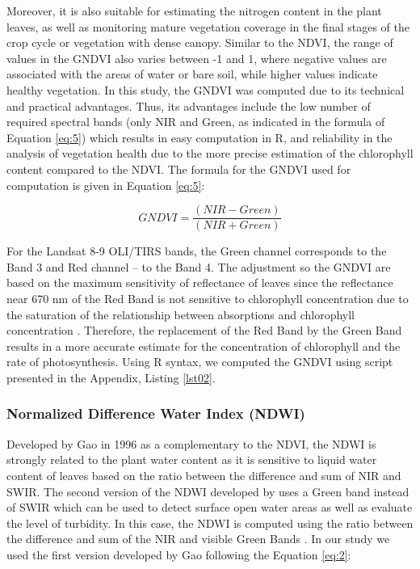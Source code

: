 \documentclass[jimaging,article,submit,pdftex,moreauthors]{Definitions/mdpi}
\begin{document}
Moreover, it is also suitable for estimating the nitrogen content in the plant leaves, as well as monitoring mature vegetation coverage in the final stages of the crop cycle or vegetation with dense canopy. Similar to the NDVI, the range of values in the GNDVI also varies between -1 and 1, where negative values are associated with the areas of water or bare soil, while higher values indicate healthy vegetation. In this study, the GNDVI was computed due to its technical and practical advantages. Thus, its advantages include the low number of required spectral bands (only NIR and Green, as indicated in the formula of Equation \ref{eq:5}) which results in easy computation in R, and reliability in the analysis of vegetation health due to the more precise estimation of the chlorophyll content compared to the NDVI. The formula for the GNDVI used for computation is given in Equation \ref{eq:5}:

\begin{equation}\label{eq:5}
	GNDVI=\dfrac{(NIR-Green)}{(NIR+Green)}
\end{equation}

For the Landsat 8-9 OLI/TIRS bands, the Green channel corresponds to the Band 3 and Red channel -- to the Band 4. The adjustment so the GNDVI are based on the maximum sensitivity of reflectance of leaves since the reflectance near 670 nm of the Red Band is not sensitive to chlorophyll concentration due to the saturation of the relationship between absorptions and chlorophyll concentration \cite{GITELSON1996289}. Therefore, the replacement of the Red Band by the Green Band results in a more accurate estimate for the concentration of chlorophyll and the rate of photosynthesis. Using R syntax, we computed the GNDVI using script presented in the Appendix, Listing \ref{lst02}. 

\subsubsection{Normalized Difference Water Index (NDWI)}

Developed by Gao in 1996 \cite{GAO1996257} as a complementary to the NDVI, the NDWI is strongly related to the plant water content as it is sensitive to liquid water content of leaves based on the ratio between the difference and sum of NIR and SWIR. The second version of the NDWI developed by \cite{rs5073544} uses a Green band instead of SWIR which can be used to detect surface open water areas as well as evaluate the level of turbidity. In this case, the NDWI is computed using the ratio between the difference and sum of the NIR and visible Green Bands \cite{ZHENG2021129488}. In our study we used the first version developed by Gao following the Equation \ref{eq:2}:
\end{document}
